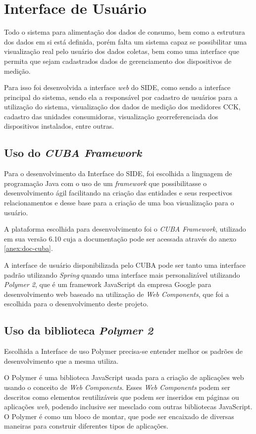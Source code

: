 \chapter{Interface de Usuário}
\label{c:interface_de_usuario}
Todo o sistema para alimentação dos dados de consumo, bem como a estrutura dos dados em si está definida, porém falta um sistema capaz se possibilitar uma visualização real pelo usuário dos dados coletas, bem como uma interface que permita que sejam cadastrados dados de gerenciamento dos dispositivos de medição.

Para isso foi desenvolvida a interface \textit{web} do SIDE, como sendo a interface principal do sistema, sendo ela a responsável por cadastro de usuários para a utilização do sistema, visualização dos dados de medição dos medidores CCK, cadastro das unidades consumidoras, visualização georreferenciada dos dispositivos instalados, entre outras.

\section{Uso do \textit{CUBA Framework}}

Para o desenvolvimento da Interface do SIDE, foi escolhida a linguagem de programação Java com o uso de um \textit{framework} que possibilitasse o desenvolvimento ágil facilitando na criação das entidades e seus respectivos relacionamentos e desse base para a criação de uma boa visualização para o usuário. 

A plataforma escolhida para desenvolvimento foi o \textit{CUBA Framework}, utilizado em sua versão 6.10 cuja a documentação pode ser acessada através do anexo \ref{anex:doc-cuba}.

A interface de usuário disponibilizada pelo CUBA pode ser tanto uma interface padrão utilizando \textit{Spring} quando uma interface mais personalizável utilizando \textit{Polymer 2}, que é um framework JavaScript da empresa Google para desenvolvimento web baseado na utilização de \textit{Web Components}, que foi a escolhida para o desenvolvimento deste projeto.

\section{Uso da biblioteca \textit{Polymer 2}}

Escolhida a Interface de uso Polymer precisa-se entender melhor os padrões de desenvolvimento que a mesma utiliza.

O Polymer é uma biblioteca JavaScript usada para a criação de aplicações web usando o conceito de \textit{Web Components}. Esses \textit{Web Components} podem ser descritos como elementos reutilizáveis que podem ser inseridos em páginas ou aplicações \textit{web}, podendo inclusive ser mesclado com outras bibliotecas JavaScript. O Polymer é como um bloco de montar, que pode ser encaixado de diversas maneiras para construir diferentes tipos de aplicações. 

